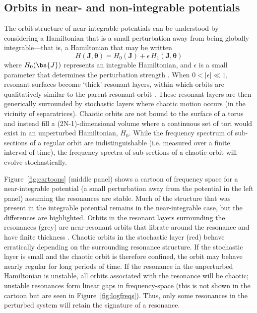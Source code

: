 \subsection{Orbits in near- and non-integrable potentials}

The orbit structure of near-integrable potentials can be understood by considering a Hamiltonian that is a small perturbation away from being globally integrable---that is, a Hamiltonian that may be written
\begin{equation}
	H(\boldsymbol{J}, \boldsymbol{\theta}) = H_0(\boldsymbol{J}) + \epsilon \, H_1(\boldsymbol{J}, \boldsymbol{\theta})
\end{equation}
where $H_0(\bs{J})$ represents an integrable Hamiltonian, and $\epsilon$ is a small parameter that determines the perturbation strength \citep[a description of perturbation theory applied to nonlinear Hamiltonians is given in][]{lichtenberg83}. When $0 < |\epsilon| \ll 1$, resonant surfaces become `thick' resonant layers, within which orbits are qualitatively similar to the parent resonant orbit \citep[e.g.,][]{merritt99}. These resonant layers are then generically surrounded by stochastic layers where chaotic motion occurs (in the vicinity of separatrices). Chaotic orbits are not bound to the surface of a torus and instead fill a (2N-1)-dimensional volume where a continuous set of tori would exist in an unperturbed Hamiltonian, $H_0$. While the frequency spectrum of sub-sections of a regular orbit are indistinguishable (i.e. measured over a finite interval of time), the frequency spectra of sub-sections of a chaotic orbit will evolve stochastically.

Figure~\ref{fig:cartoons} (middle panel) shows a cartoon of frequency space for a near-integrable potential (a small perturbation away from the potential in the left panel) assuming the resonances are stable. Much of the structure that was present in the integrable potential remains in the near-integrable case, but the differences are highlighted. Orbits in the resonant layers surrounding the resonances (grey) are near-resonant orbits that librate around the resonance and have finite thickness \citep[e.g.,][]{merritt99}. Chaotic orbits in the stochastic layer (red) behave erratically depending on the surrounding resonance structure. If the stochastic layer is small and the chaotic orbit is therefore confined, the orbit may behave nearly regular for long periods of time. If the resonance in the unperturbed Hamiltonian is unstable, all orbits associated with the resonance will be chaotic; unstable resonances form linear gaps in frequency-space (this is not shown in the cartoon but are seen in Figure~\ref{fig:logfreqs}). Thus, only some resonances in the perturbed system will retain the signature of a resonance.

